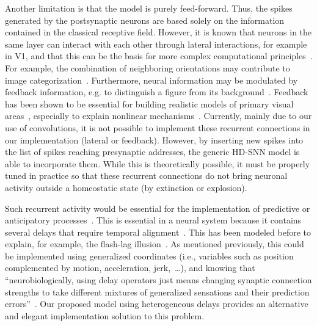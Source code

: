 \documentclass[default]{sn-jnl}%
\theoremstyle{thmstyleone}%
\theoremstyle{thmstyletwo}%
\theoremstyle{thmstylethree}%
\begin{document}
Another limitation is that the model is purely feed-forward. Thus, the spikes generated by the postsynaptic neurons are based solely on the information contained in the classical receptive field. However, it is known that neurons in the same layer can interact with each other through lateral interactions, for example in V1, and that this can be the basis for more complex computational principles~\citep{chavane_revisiting_2022}. For example, the combination of neighboring orientations may contribute to image categorization~\citep{perrinet_edge_2015}. Furthermore, neural information may be modulated by feedback information, e.g. to distinguish a figure from its background~\citep{roelfsema_early_2016}. Feedback has been shown to be essential for building realistic models of primary visual areas~\citep{boutin_sparse_2020, boutin_effect_2020}, especially to explain nonlinear mechanisms~\citep{boutin_pooling_2022}. Currently, mainly due to our use of convolutions, it is not possible to implement these recurrent connections in our implementation (lateral or feedback). However, by inserting new spikes into the list of spikes reaching presynaptic addresses, the generic HD-SNN model is able to incorporate them. While this is theoretically possible, it must be properly tuned in practice so that these recurrent connections do not bring neuronal activity outside a homeostatic state (by extinction or explosion).

Such recurrent activity would be essential for the implementation of predictive or anticipatory processes~\citep{Benvenuti2020}. This is essential in a neural system because it contains several delays that require temporal alignment~\citep{hogendoorn_predictive_2019}. This has been modeled before to explain, for example, the flash-lag illusion~\citep{khoei_flash-lag_2017}. As mentioned previously, this could be implemented using generalized coordinates (i.e., variables such as position complemented by motion, acceleration, jerk,~\ldots), and  knowing that ``neurobiologically, using delay operators just means changing synaptic connection strengths to take different mixtures of generalized sensations and their prediction errors''~\citep{perrinet_active_2014}. Our proposed model using heterogeneous delays provides an alternative and elegant implementation solution to this problem.
%
\end{document}
